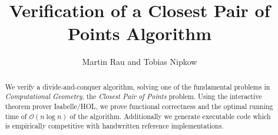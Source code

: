 \documentclass{llncs}
\begin{document}
\title{Verification of a Closest Pair of Points Algorithm}
\author{Martin Rau and Tobias Nipkow}
\date{}
\maketitle

\begin{abstract}
We verify a divide-and-conquer algorithm, solving one of the fundamental problems
in \textit{Computational Geometry}, the \textit{Closest Pair of Points} problem.
Using the interactive theorem prover Isabelle/HOL, we prove functional correctness
and the optimal running time of $\mathcal{O}(n \log n)$ of the algorithm. 
Additionally we generate executable code which is empirically competitive with handwritten
reference implementations.
\end{abstract}





\end{document}
